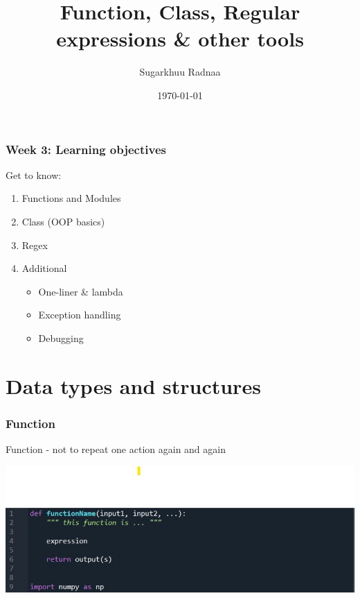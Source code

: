 \documentclass{beamer}
\title[Introduction to Python]{Function, Class, Regular expressions \& other tools}
\author{Sugarkhuu Radnaa}
\institute[]
{
Py4Econ in Ulaanbaatar \\ 
\medskip
\textit{py4econ@gmail.com} 
}
\date{\today}  %
\begin{document}
\begin{frame}
\titlepage %
\end{frame}

\begin{frame}
    \frametitle{Week 3: Learning objectives}
    Get to know: 
    \begin{enumerate}
        \item Functions and Modules
        \item Class (OOP basics)
        \item Regex 
        \item Additional
        \begin{itemize}
            \item One-liner & lambda
            \item Exception handling
            \item Debugging
        \end{itemize}         
    \end{enumerate}
\end{frame}

\section{Data types and structures} 

\begin{frame}
\frametitle{Function}
Function - not to repeat one action again and again
    \begin{center}
        \includegraphics[scale=0.5]{figures/function.jpg}
    \end{center}        
\end{frame}
\end{document}
